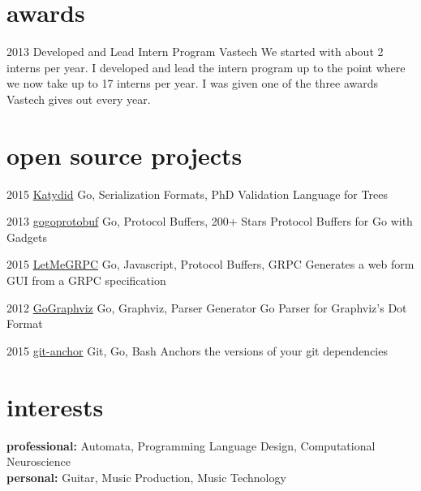 \documentclass[]{friggeri-cv} %
\begin{document}
\section{awards}

\begin{entrylist}

\entry
{2013}
{Developed and Lead Intern Program}
{Vastech}
{We started with about 2 interns per year. I developed and lead the intern program up to the point where we now take up to 17 interns per year.  I was given one of the three awards Vastech gives out every year.}

\end{entrylist}

\section{open source projects}

\begin{entrylist}

\entry
{2015}
{\href{https://github.com/katydid/katydid}{Katydid}}
{Go, Serialization Formats, PhD}
{Validation Language for Trees}

\entry
{2013}
{\href{https://github.com/gogo/protobuf}{gogoprotobuf}}
{Go, Protocol Buffers, 200+ Stars}
{Protocol Buffers for Go with Gadgets}

\entry
{2015}
{\href{https://github.com/gogo/letmegrpc}{LetMeGRPC}}
{Go, Javascript, Protocol Buffers, GRPC}
{Generates a web form GUI from a GRPC specification}

\entry
{2012}
{\href{https://github.com/awalterschulze/gographviz}{GoGraphviz}}
{Go, Graphviz, Parser Generator}
{Go Parser for Graphviz's Dot Format}

\entry
{2015}
{\href{https://github.com/awalterschulze/git-anchor}{git-anchor}}
{Git, Go, Bash}
{Anchors the versions of your git dependencies}

\end{entrylist}

\section{interests}

\textbf{professional:} Automata, Programming Language Design, Computational Neuroscience \\
\textbf{personal:} Guitar, Music Production, Music Technology
\end{document}
